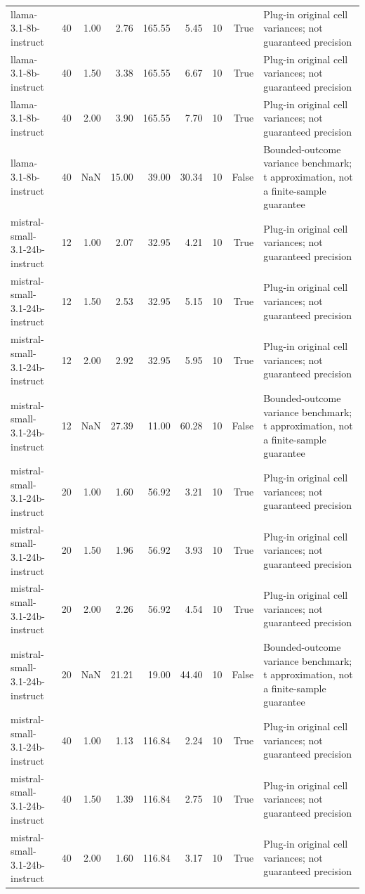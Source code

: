 \begin{tabular}{lrrrrrrrl}
llama-3.1-8b-instruct & 40 & 1.00 & 2.76 & 165.55 & 5.45 & 10 & True & Plug-in original cell variances; not guaranteed precision \\
llama-3.1-8b-instruct & 40 & 1.50 & 3.38 & 165.55 & 6.67 & 10 & True & Plug-in original cell variances; not guaranteed precision \\
llama-3.1-8b-instruct & 40 & 2.00 & 3.90 & 165.55 & 7.70 & 10 & True & Plug-in original cell variances; not guaranteed precision \\
llama-3.1-8b-instruct & 40 & NaN & 15.00 & 39.00 & 30.34 & 10 & False & Bounded-outcome variance benchmark; t approximation, not a finite-sample guarantee \\
mistral-small-3.1-24b-instruct & 12 & 1.00 & 2.07 & 32.95 & 4.21 & 10 & True & Plug-in original cell variances; not guaranteed precision \\
mistral-small-3.1-24b-instruct & 12 & 1.50 & 2.53 & 32.95 & 5.15 & 10 & True & Plug-in original cell variances; not guaranteed precision \\
mistral-small-3.1-24b-instruct & 12 & 2.00 & 2.92 & 32.95 & 5.95 & 10 & True & Plug-in original cell variances; not guaranteed precision \\
mistral-small-3.1-24b-instruct & 12 & NaN & 27.39 & 11.00 & 60.28 & 10 & False & Bounded-outcome variance benchmark; t approximation, not a finite-sample guarantee \\
mistral-small-3.1-24b-instruct & 20 & 1.00 & 1.60 & 56.92 & 3.21 & 10 & True & Plug-in original cell variances; not guaranteed precision \\
mistral-small-3.1-24b-instruct & 20 & 1.50 & 1.96 & 56.92 & 3.93 & 10 & True & Plug-in original cell variances; not guaranteed precision \\
mistral-small-3.1-24b-instruct & 20 & 2.00 & 2.26 & 56.92 & 4.54 & 10 & True & Plug-in original cell variances; not guaranteed precision \\
mistral-small-3.1-24b-instruct & 20 & NaN & 21.21 & 19.00 & 44.40 & 10 & False & Bounded-outcome variance benchmark; t approximation, not a finite-sample guarantee \\
mistral-small-3.1-24b-instruct & 40 & 1.00 & 1.13 & 116.84 & 2.24 & 10 & True & Plug-in original cell variances; not guaranteed precision \\
mistral-small-3.1-24b-instruct & 40 & 1.50 & 1.39 & 116.84 & 2.75 & 10 & True & Plug-in original cell variances; not guaranteed precision \\
mistral-small-3.1-24b-instruct & 40 & 2.00 & 1.60 & 116.84 & 3.17 & 10 & True & Plug-in original cell variances; not guaranteed precision \\

\end{tabular}
